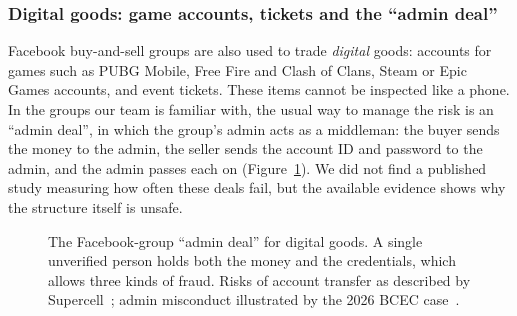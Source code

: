 \subsubsection*{Digital goods: game accounts, tickets and the ``admin deal''}

Facebook buy-and-sell groups are also used to trade \emph{digital} goods: accounts for games
such as PUBG Mobile, Free Fire and Clash of Clans, Steam or Epic Games accounts, and event
tickets. These items cannot be inspected like a phone. In the groups our team is familiar with,
the usual way to manage the risk is an ``admin deal'', in which the group's admin acts as a
middleman: the buyer sends the money to the admin, the seller
sends the account ID and password to the admin, and the admin passes each on
(Figure~\ref{fig:admin_deal}). We did not find a published study measuring how often these
deals fail, but the available evidence shows why the structure itself is unsafe.

\begin{figure}[H]
  \centering
  \resizebox{0.97\textwidth}{!}{}
  \caption{The Facebook-group ``admin deal'' for digital goods. A single unverified person holds
  both the money and the credentials, which allows three kinds of fraud. Risks of account
  transfer as described by Supercell~\cite{supercell_fairplay}; admin misconduct illustrated by
  the 2026 BCEC case~\cite{fe_bcec}.}
  \label{fig:admin_deal}
\end{figure}

